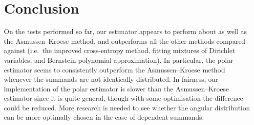 

\section{Conclusion} \label{Sec:Conclusion}

On the tests performed so far, our estimator appears to perform about as well as the Asmussen--Kroese method, and outperforms all the other methods compared against (i.e.\ the improved cross-entropy method, fitting mixtures of Dirichlet variables, and Bernstein polynomial approximation). In particular, the polar estimator seems to consistently outperform the Asmussen--Kroese method whenever the summands are not identically distributed. In fairness, our implementation of the polar estimator is slower than the Asmussen--Kroese estimator since it is quite general, though with some optimisation the difference could be reduced. More research is needed to see whether the angular distribution can be more optimally chosen in the case of dependent summands.